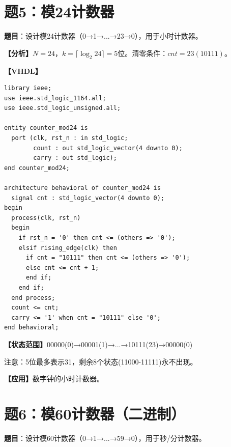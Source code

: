 \section{题5：模24计数器}

\textbf{题目}：设计模24计数器（0→1→...→23→0），用于小时计数器。

\begin{solution}[完整解答]

\textbf{【分析】}$N=24$，$k=\lceil\log_2 24\rceil=5$位。清零条件：$cnt=23(10111)$。

\textbf{【VHDL】}
\begin{lstlisting}
library ieee;
use ieee.std_logic_1164.all;
use ieee.std_logic_unsigned.all;

entity counter_mod24 is
  port (clk, rst_n : in std_logic;
        count : out std_logic_vector(4 downto 0);
        carry : out std_logic);
end counter_mod24;

architecture behavioral of counter_mod24 is
  signal cnt : std_logic_vector(4 downto 0);
begin
  process(clk, rst_n)
  begin
    if rst_n = '0' then cnt <= (others => '0');
    elsif rising_edge(clk) then
      if cnt = "10111" then cnt <= (others => '0');
      else cnt <= cnt + 1;
      end if;
    end if;
  end process;
  count <= cnt;
  carry <= '1' when cnt = "10111" else '0';
end behavioral;
\end{lstlisting}

\textbf{【状态范围】}00000(0)→00001(1)→...→10111(23)→00000(0)

注意：5位最多表示31，剩余8个状态(11000-11111)永不出现。

\textbf{【应用】}数字钟的小时计数器。

\end{solution}


\section{题6：模60计数器（二进制）}

\textbf{题目}：设计模60计数器（0→1→...→59→0），用于秒/分计数器。

